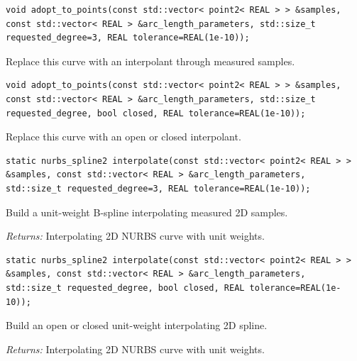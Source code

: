 \par\noindent\begin{minipage}{\linewidth}
\begin{lstlisting}[style=apireference]
void adopt_to_points(const std::vector< point2< REAL > > &samples, const std::vector< REAL > &arc_length_parameters, std::size_t requested_degree=3, REAL tolerance=REAL(1e-10));
\end{lstlisting}
{\footnotesize Replace this curve with an interpolant through measured samples.\par}
\end{minipage}\par\vspace{1pt}
\par\noindent\begin{minipage}{\linewidth}
\begin{lstlisting}[style=apireference]
void adopt_to_points(const std::vector< point2< REAL > > &samples, const std::vector< REAL > &arc_length_parameters, std::size_t requested_degree, bool closed, REAL tolerance=REAL(1e-10));
\end{lstlisting}
{\footnotesize Replace this curve with an open or closed interpolant.\par}
\end{minipage}\par\vspace{1pt}
\par\noindent\begin{minipage}{\linewidth}
\begin{lstlisting}[style=apireference]
static nurbs_spline2 interpolate(const std::vector< point2< REAL > > &samples, const std::vector< REAL > &arc_length_parameters, std::size_t requested_degree=3, REAL tolerance=REAL(1e-10));
\end{lstlisting}
{\footnotesize Build a unit-weight B-spline interpolating measured 2D samples.\par}
{\footnotesize\textit{Returns:} Interpolating 2D NURBS curve with unit weights.\par}
\end{minipage}\par\vspace{1pt}
\par\noindent\begin{minipage}{\linewidth}
\begin{lstlisting}[style=apireference]
static nurbs_spline2 interpolate(const std::vector< point2< REAL > > &samples, const std::vector< REAL > &arc_length_parameters, std::size_t requested_degree, bool closed, REAL tolerance=REAL(1e-10));
\end{lstlisting}
{\footnotesize Build an open or closed unit-weight interpolating 2D spline.\par}
{\footnotesize\textit{Returns:} Interpolating 2D NURBS curve with unit weights.\par}
\end{minipage}\par\vspace{1pt}
